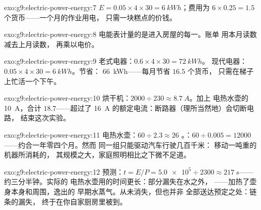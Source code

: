 \begin{solution}{exo:g9:electric-power-energy:7}
$E = 0.05 \times 4 \times 30 = \qty{6}{kWh}$；费用为 $6 \times
0.25 = 1.5$ 个货币——一个月的作业用电，
只需一块糕点的价钱。
\end{solution}

\begin{solution}{exo:g9:electric-power-energy:8}
电能表计量的是进入房屋的每一。账单
用本月读数减去上月读数，
再乘以电价。
\end{solution}

\begin{solution}{exo:g9:electric-power-energy:9}
老式电器：$0.6 \times 4 \times 30 = \qty{72}{kWh}$。
现代电器：$0.05 \times 4 \times 30 = \qty{6}{kWh}$。节省：
\qty{66}{kWh}——每月节省 $16.5$ 个货币，
只需在梯子上忙活一个下午。
\end{solution}

\begin{solution}{exo:g9:electric-power-energy:10}
烘干机：$2000 \div 230 \approx \qty{8.7}{A}$。加上
电热水壶的 \qty{10}{A}，合计 $18.7$——超过了 \qty{16}{A}
的额定电流：断路器（理所当然地）会切断电路，
结束这次实验。
\end{solution}

\begin{solution}{exo:g9:electric-power-energy:11}
电热水壶：$60 \div 2.3 \approx 26$ 。：$60 \div
0.005 = 12000$ ——约合一年零四个月。然而
同一组只能驱动汽车行驶几百千米：
移动一吨重的机器所消耗的，
其规模之大，家庭照明相比之下微不足道。
\end{solution}

\begin{solution}{exo:g9:electric-power-energy:12}
预测：$t = E/P = \num{5.0e5} \div 2300 \approx
\qty{217}{s}$——约三分半钟。实际的
电热水壶用的时间更长：部分漏失在水之外，
——加热了壶身本身和周围，逸出的
早期水蒸气。从未消失，但也并非
全部送达预定之处：链条的漏失，
终于在你自家厨房里被到。
\end{solution}

